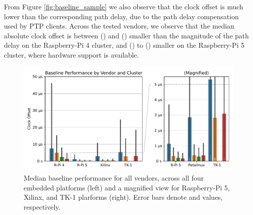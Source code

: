 From Figure \ref{fig:baseline_sample} we also observe that the clock offset is much lower than the corresponding path delay, due to the path delay compensation used by PTP clients. Across the tested vendors, we observe that the median absolute clock offset is between \fRatio{\cmpMin} (\fVendor{\cmpMinArg}) and \fRatio{\cmpMax} (\fVendor{\cmpMaxArg}) smaller than the magnitude of the path delay on the Raspberry-Pi 4 cluster,%
%
and \fRatio[-1]{\cmpMin} (\fVendor{\cmpMinArg}) to \fRatio[-1]{\cmpMax} (\fVendor{\cmpMaxArg}) smaller on the Raspberry-Pi 5 cluster, where hardware support is available.



\begin{figure}
    \centering
    \includegraphics[width=\linewidth]{res/generated/base/vendor_comparison.pdf}
    \legend
    \caption{Median baseline performance for all vendors, across all four
    embedded platforms (left) and a magnified view for Raspberry-Pi 5,
    Xilinx, and TK-1 plarforms (right).
    Error bars denote \PFive{} and \PNineFive{} values, respectively.}
    \label{fig:baseline}
\end{figure}

